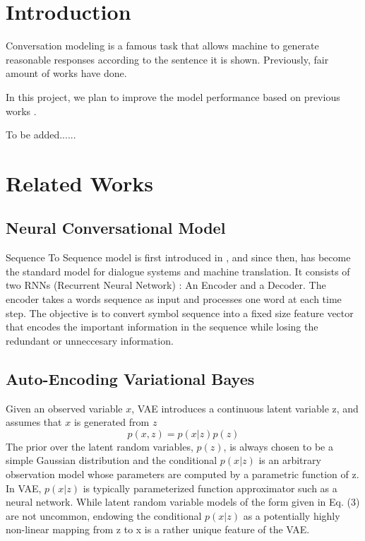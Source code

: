 \documentclass{article}
\begin{document}
\section{Introduction}
Conversation modeling is a famous task that allows machine to generate reasonable responses according to the sentence it is shown. Previously, fair amount of works have done.

In this project, we plan to improve the model performance based on previous works .

To be added......



\section{Related Works}

\subsection{Neural Conversational Model}

Sequence To Sequence model is first introduced in \cite{seq2seq}, and since then, has become the standard model for dialogue systems and machine translation. It consists of two RNNs (Recurrent Neural Network) : An Encoder and a Decoder. The encoder takes a words sequence as input and processes one word at each time step. The objective is to convert symbol sequence into a fixed size feature vector that encodes the important information in the sequence while losing the redundant or unneccesary information.



\cite{ncm}
\cite{seq2seq}

\subsection{Auto-Encoding Variational Bayes}
\cite{vae}

Given an observed variable $x$, VAE introduces a continuous latent variable z, and assumes that $x$ is generated from $z$
$$p(x,z) = p(x|z)p(z)$$
The prior over the latent random variables, $p(z)$, is always chosen to be a simple Gaussian distribution and the conditional $p(x|z)$ is an arbitrary observation model whose parameters are computed by a parametric function of z. 
In VAE, $p(x|z)$ is typically parameterized function approximator such as a neural network. While latent random variable models of the form given in Eq. (3) are not uncommon, endowing the conditional $p(x|z)$ as a potentially highly non-linear mapping from z to x is a rather unique feature of the VAE.
\end{document}
